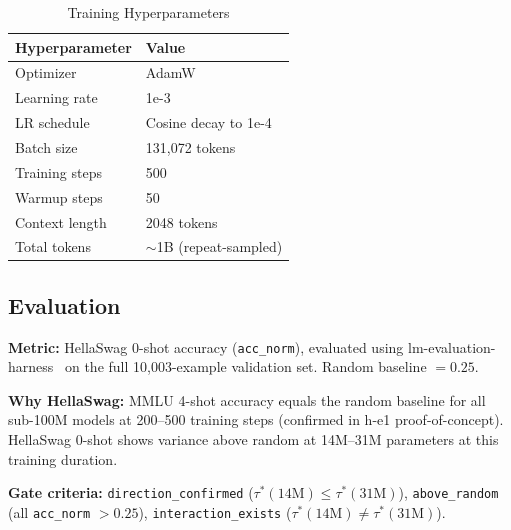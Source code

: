 \begin{table}[h]
\centering
\caption{Training Hyperparameters}
\label{tab:hyperparams}
\begin{tabular}{ll}
\toprule
\textbf{Hyperparameter} & \textbf{Value} \\
\midrule
Optimizer & AdamW \\
Learning rate & 1e-3 \\
LR schedule & Cosine decay to 1e-4 \\
Batch size & 131,072 tokens \\
Training steps & 500 \\
Warmup steps & 50 \\
Context length & 2048 tokens \\
Total tokens & $\sim$1B (repeat-sampled) \\
\bottomrule
\end{tabular}
\end{table}

\subsection{Evaluation}

\textbf{Metric:} HellaSwag 0-shot accuracy (\texttt{acc\_norm}), evaluated using lm-evaluation-harness~\cite{Gao2021Harness} on the full 10,003-example validation set. Random baseline $= 0.25$.

\textbf{Why HellaSwag:} MMLU 4-shot accuracy equals the random baseline for all sub-100M models at 200--500 training steps (confirmed in h-e1 proof-of-concept). HellaSwag 0-shot shows variance above random at 14M--31M parameters at this training duration.

\textbf{Gate criteria:} \texttt{direction\_confirmed} ($\tau^*(14\text{M}) \leq \tau^*(31\text{M})$), \texttt{above\_random} (all \texttt{acc\_norm} $> 0.25$), \texttt{interaction\_exists} ($\tau^*(14\text{M}) \neq \tau^*(31\text{M})$).
